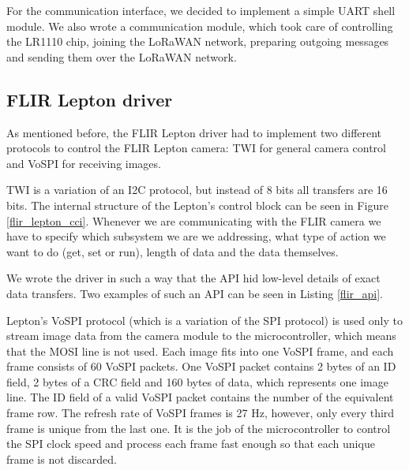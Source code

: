 For the communication interface, we decided to implement a simple UART shell module.
We also wrote a communication module, which took care of controlling the LR1110 chip, joining the LoRaWAN network, preparing outgoing messages and sending them over the LoRaWAN network.

\subsection{ FLIR Lepton driver}

As mentioned before, the FLIR Lepton driver had to implement two different protocols to control the FLIR Lepton camera: TWI for general camera control and VoSPI for receiving images.

TWI is a variation of an I2C protocol, but instead of 8 bits all transfers are 16 bits.
The internal structure of the Lepton's control block can be seen in Figure \ref{flir_lepton_cci}.
Whenever we are communicating with the FLIR camera we have to specify which subsystem we are we addressing, what type of action we want to do (get, set or run), length of data and the data themselves.

We wrote the driver in such a way that the API hid low-level details of exact data transfers. 
Two examples of such an API can be seen in Listing \ref{flir_api}.

Lepton's VoSPI protocol (which is a variation of the SPI protocol) is used only to stream image data from the camera module to the microcontroller, which means that the MOSI line is not used.
Each image fits into one VoSPI frame, and each frame consists of 60 VoSPI packets.
One VoSPI packet contains 2 bytes of an ID field, 2 bytes of a CRC field and 160 bytes of data\footnotemark, which represents one image line.
The ID field of a valid VoSPI packet contains the number of the equivalent frame row.
The refresh rate of VoSPI frames is 27 \si{\hertz}, however, only every third frame is unique from the last one.
It is the job of the microcontroller to control the SPI clock speed and process each frame fast enough so that each unique frame is not discarded.

